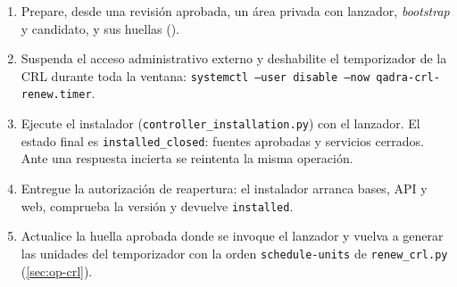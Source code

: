 \begin{enumerate}
  \item Prepare, desde una revisión aprobada, un área privada con lanzador,
    \emph{bootstrap} y candidato, y sus huellas
    ().
  \item Suspenda el acceso administrativo externo y deshabilite el
    temporizador de la CRL durante toda la ventana:
    \texttt{systemctl --user disable --now qadra-crl-renew.timer}.
  \item Ejecute el instalador (\texttt{controller\_installation.py}) con
    el lanzador. El estado final es \texttt{installed\_closed}: fuentes
    aprobadas y servicios cerrados. Ante una respuesta incierta se
    reintenta la misma operación.
  \item Entregue la autorización de reapertura: el instalador arranca
    bases, API y web, comprueba la versión y devuelve \texttt{installed}.
  \item Actualice la huella aprobada donde se invoque el lanzador y vuelva
    a generar las unidades del temporizador con la orden
    \texttt{schedule-units} de \texttt{renew\_crl.py} (\cref{sec:op-crl}).
\end{enumerate}

